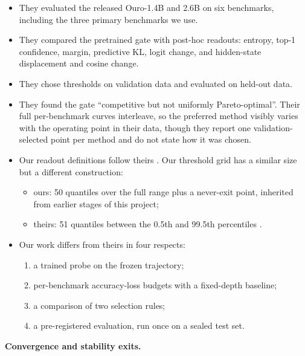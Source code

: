 \begin{itemize}
\tightlist
\item
  They evaluated the released Ouro-1.4B and 2.6B on six benchmarks, including the three primary benchmarks we use.
\item
  They compared the pretrained gate with post-hoc readouts: entropy, top-1 confidence, margin, predictive KL, logit change, and hidden-state
  displacement and cosine change.
\item
  They chose thresholds on validation data and evaluated on held-out data.
\item
  They found the gate ``competitive but not uniformly Pareto-optimal''. Their full per-benchmark curves interleave, so the preferred method
  visibly varies with the operating point in their data, though they report one validation-selected point per method and do not state how it was chosen.
\item
  Our readout definitions follow theirs \citep[appendix B.6]{Popescu2026}. Our threshold grid has a similar size but a different construction:

  \begin{itemize}
  \tightlist
  \item
    ours: 50 quantiles over the full range plus a never-exit point, inherited from earlier stages of this project;
  \item
    theirs: 51 quantiles between the 0.5th and 99.5th percentiles \citep[appendix B.5]{Popescu2026}.
  \end{itemize}
\item
  Our work differs from theirs in four respects:

  \begin{enumerate}
  \def\labelenumi{\arabic{enumi}.}
  \tightlist
  \item
    a trained probe on the frozen trajectory;
  \item
    per-benchmark accuracy-loss budgets with a fixed-depth baseline;
  \item
    a comparison of two selection rules;
  \item
    a pre-registered evaluation, run once on a sealed test set.
  \end{enumerate}
\end{itemize}

\textbf{Convergence and stability exits.}

